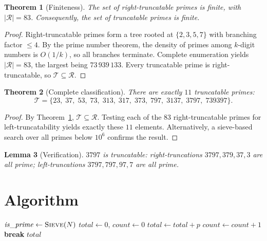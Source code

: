 \documentclass[12pt]{article}
\newtheorem{theorem}{Theorem}
\newtheorem{lemma}[theorem]{Lemma}
\theoremstyle{definition}
\begin{document}
\begin{theorem}[Finiteness]
\label{thm:finite}
The set of right-truncatable primes is finite, with $|\mathcal{R}| = 83$. Consequently, the set of truncatable primes is finite.
\end{theorem}
\begin{proof}
Right-truncatable primes form a tree rooted at $\{2,3,5,7\}$ with branching factor $\le 4$. By the prime number theorem, the density of primes among $k$-digit numbers is $O(1/k)$, so all branches terminate. Complete enumeration yields $|\mathcal{R}| = 83$, the largest being $73\,939\,133$. Every truncatable prime is right-truncatable, so $\mathcal{T} \subseteq \mathcal{R}$.
\end{proof}

\begin{theorem}[Complete classification]
There are exactly $11$ truncatable primes:
\[
    \mathcal{T} = \{23,\; 37,\; 53,\; 73,\; 313,\; 317,\; 373,\; 797,\; 3137,\; 3797,\; 739397\}.
\]
\end{theorem}
\begin{proof}
By Theorem~\ref{thm:finite}, $\mathcal{T} \subseteq \mathcal{R}$. Testing each of the $83$ right-truncatable primes for left-truncatability yields exactly these $11$ elements. Alternatively, a sieve-based search over all primes below $10^6$ confirms the result.
\end{proof}

\begin{lemma}[Verification]
$3797$ is truncatable: right-truncations $3797, 379, 37, 3$ are all prime; left-truncations $3797, 797, 97, 7$ are all prime.
\end{lemma}

\section{Algorithm}

\begin{algorithmic}[1]
    \State $\mathit{is\_prime} \gets \Call{Sieve}{N}$
    \State $\mathit{total} \gets 0$, $\mathit{count} \gets 0$
            \State $\mathit{total} \gets \mathit{total} + p$
            \State $\mathit{count} \gets \mathit{count} + 1$
             \textbf{break} \EndIf
        \EndIf
    \EndFor
    \State \Return $\mathit{total}$
\EndFunction
\end{algorithmic}
\end{document}
